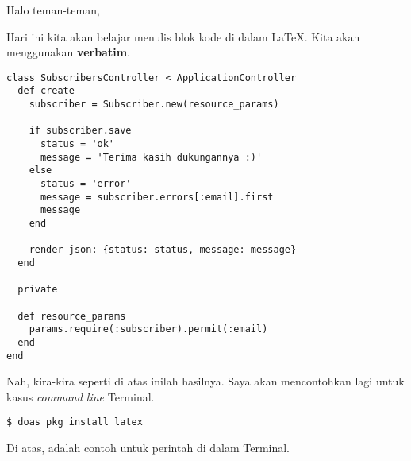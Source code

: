 \documentclass[12pt, times new roman]{article}
\begin{document}
Halo teman-teman,

Hari ini kita akan belajar menulis blok kode di dalam LaTeX. Kita akan menggunakan \textbf{verbatim}.

\begin{verbatim}
class SubscribersController < ApplicationController
  def create
    subscriber = Subscriber.new(resource_params)

    if subscriber.save
      status = 'ok'
      message = 'Terima kasih dukungannya :)'
    else
      status = 'error'
      message = subscriber.errors[:email].first
      message
    end

    render json: {status: status, message: message}
  end

  private

  def resource_params
    params.require(:subscriber).permit(:email)
  end
end
\end{verbatim}

Nah, kira-kira seperti di atas inilah hasilnya. Saya akan mencontohkan lagi untuk kasus \textit{command line} Terminal.

\begin{verbatim}
$ doas pkg install latex
\end{verbatim}

Di atas, adalah contoh untuk perintah di dalam Terminal.
\end{document}

